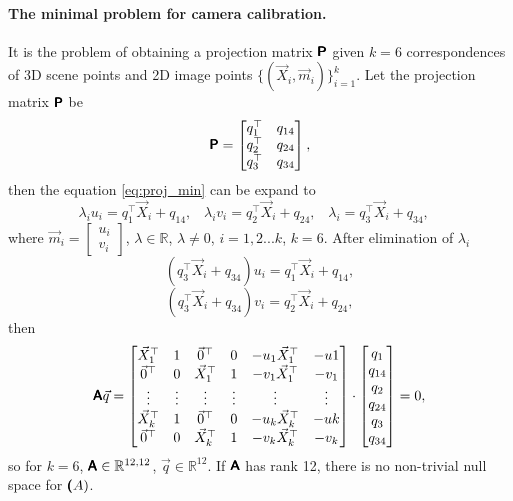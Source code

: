 \paragraph{The minimal problem for camera calibration.} 
It is the problem of obtaining a projection matrix $\pmb{\mathsf{P}}$ given $k=6$ correspondences of 3D scene points and 2D image points $\{(\vec{X}_i, \vec{m}_i)\}_{i=1}^k$.
Let the projection matrix $\pmb{\mathsf{P}}$ be 
\begin{equation}
    \label{eq:p_calib}
    \pmb{\mathsf{P}} = \begin{bmatrix}
        q_1^\top & q_{14} \\
        q_2^\top & q_{24} \\
        q_3^\top & q_{34} \\
    \end{bmatrix},    
\end{equation}
then the equation \eqref{eq:proj_min} can be expand to
\begin{equation}
    \lambda_i u_i = q_1^\top \vec{X}_i + q_{14}, \;\;\;
    \lambda_i v_i = q_2^\top \vec{X}_i + q_{24}, \;\;\;
    \lambda_i = q_3^\top \vec{X}_i + q_{34}, \;\;\;
\end{equation}
where $\vec{m}_i = \begin{bmatrix} u_i \\ v_i \end{bmatrix}$, $ \lambda \in \mathbb{R}$, $\lambda \neq 0$, $i = 1, 2 ... k$, $k = 6$.
After elimination of $\lambda_i$
\begin{equation}
    (q_3^\top \vec{X}_i + q_{34})u_i = q_1^\top \vec{X}_i + q_{14},
\end{equation}
\begin{equation}
    (q_3^\top \vec{X}_i + q_{34})v_i = q_2^\top \vec{X}_i + q_{24},
\end{equation}
then
\begin{equation}
    \pmb{\mathsf{A}} \vec{q} = \begin{bmatrix}
        \vec{X}_1^\top & 1 & \vec{0}^\top & 0 & -u_1 \vec{X}_1^\top & -u1 \\
        \vec{0}^\top & 0 & \vec{X}_1^\top & 1 & -v_1 \vec{X}_1^\top & -v_1 \\ 
        \vdots & \vdots & \vdots & \vdots & \vdots & \vdots \\
        \vec{X}_k^\top & 1 & \vec{0}^\top & 0 & -u_k \vec{X}_k^\top & -uk \\
        \vec{0}^\top & 0 & \vec{X}_k^\top & 1 & -v_k \vec{X}_k^\top & -v_k \\ 
    \end{bmatrix} \cdot \begin{bmatrix}
        q_1 \\ q_{14} \\ q_2 \\ q_{24} \\ q_3 \\ q_{34}
    \end{bmatrix} = 0,
\end{equation}
so for $k=6$, $\pmb{\mathsf{A}} \in \mathbb{R}^{12, 12}$, $\vec{q} \in \mathbb{R}^{12}$. If $\pmb{\mathsf{A}}$ has rank 12, there is no non-trivial null space for $\pmb{\mathsf{(}}A)$.

